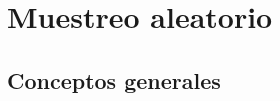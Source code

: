 \chapter{Muestreo aleatorio}\label{ch:randomsampling}

\section{Conceptos generales}\label{subc:rs_congen}


